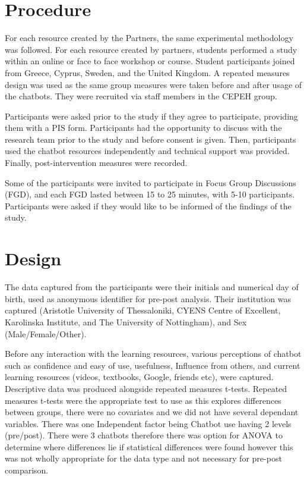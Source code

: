 \documentclass[a4paper, nobind]{templates/ociamthesis}
\begin{document}
\hypertarget{procedure}{%
\section{Procedure}\label{procedure}}

For each resource created by the Partners, the same experimental methodology was followed.
For each resource created by partners, students performed a study within an online or face to face workshop or course.
Student participants joined from Greece, Cyprus, Sweden, and the United Kingdom.
A repeated measures design was used as the same group measures were taken before and after usage of the chatbots.
They were recruited via staff members in the CEPEH group.

Participants were asked prior to the study if they agree to participate, providing them with a PIS form.
Participants had the opportunity to discuss with the research team prior to the study and before consent is given.
Then, participants used the chatbot resources independently and technical support was provided.
Finally, post-intervention measures were recorded.

Some of the participants were invited to participate in Focus Group Discussions (FGD), and each FGD lasted between 15 to 25 minutes, with 5-10 participants.
Participants were asked if they would like to be informed of the findings of the study.

\hypertarget{design}{%
\section{Design}\label{design}}

The data captured from the participants were their initials and numerical day of birth, used as anonymous identifier for pre-post analysis.
Their institution was captured (Aristotle University of Thessaloniki, CYENS Centre of Excellent, Karolinska Institute, and The University of Nottingham), and Sex (Male/Female/Other).

Before any interaction with the learning resources, various perceptions of chatbot such as confidence and easy of use, usefulness, Influence from others, and current learning resources (videos, textbooks, Google, friends etc), were captured.
Descriptive data was produced alongside repeated measures t-tests.
Repeated measures t-tests were the appropriate test to use as this explores differences between groups, there were no covariates and we did not have several dependant variables.
There was one Independent factor being Chatbot use having 2 levels (pre/post).
There were 3 chatbots therefore there was option for ANOVA to determine where differences lie if statistical differences were found however this was not wholly appropriate for the data type and not necessary for pre-post comparison.
\end{document}
